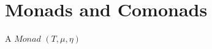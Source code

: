 \chapter{Monads and Comonads}

\begin{definition}[Monad]
    A $Monad$ $(T,\mu, \eta) $  
\end{definition}